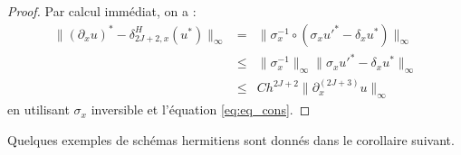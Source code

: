 \begin{proof}
Par calcul immédiat, on a :
\begin{equation}
\begin{array}{rcl}
\|  (\partial_x u)^* - \delta_{2J+2,x}^H (u^*) \|_{\infty} &=& \| \sigma_{x}^{-1} \circ \left( \sigma_{x} u'^*  - \delta_{x}u^*\right) \|_{\infty}\\
                                      &\leq& \| \sigma_{x}^{-1} \|_{\infty} \| \sigma_{x} u'^*  - \delta_{x}u^*\|_{\infty}\\
                                      &\leq& C h^{2J+2}  \| \partial_x^{(2J+3)} u \|_{\infty}
\end{array}
\end{equation}
en utilisant $\sigma_{x}$ inversible et l'équation \eqref{eq:eq_cons}.
\end{proof}
Quelques exemples de schémas hermitiens sont donnés dans le corollaire suivant.

